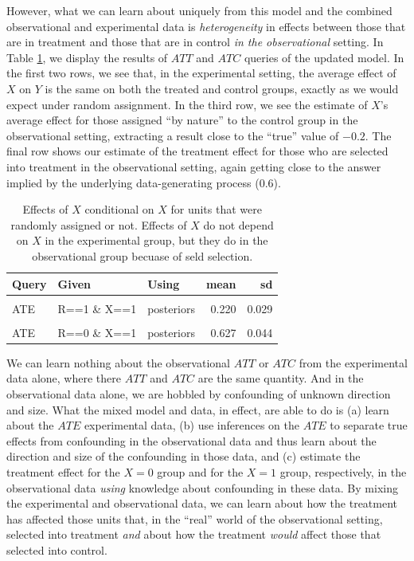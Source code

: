 \documentclass[
  12pt,
]{book}
\begin{document}
However, what we can learn about uniquely from this model and the combined observational and experimental data is \emph{heterogeneity} in effects between those that are in treatment and those that are in control \emph{in the observational} setting. In Table \ref{tab:combexpobsattatc}, we display the results of \(ATT\) and \(ATC\) queries of the updated model. In the first two rows, we see that, in the experimental setting, the average effect of \(X\) on \(Y\) is the same on both the treated and control groups, exactly as we would expect under random assignment. In the third row, we see the estimate of \(X\)'s average effect for those assigned ``by nature'' to the control group in the observational setting, extracting a result close to the ``true'' value of \(-0.2\). The final row shows our estimate of the treatment effect for those who are selected into treatment in the observational setting, again getting close to the answer implied by the underlying data-generating process (\(0.6\)).

\begin{table}

\caption{\label{tab:combexpobsattatc}Effects of $X$ conditional on $X$ for units that were randomly assigned or not.  Effects of $X$ do not depend on $X$ in the experimental group, but they do in the observational group becuase of seld selection. }
\centering
\begin{tabular}[t]{lllrr}
\toprule
Query & Given & Using & mean & sd\\
\midrule
\cellcolor{gray!6}{ATE} & \cellcolor{gray!6}{R==1 \& X==0} & \cellcolor{gray!6}{posteriors} & \cellcolor{gray!6}{0.220} & \cellcolor{gray!6}{0.029}\\
ATE & R==1 \& X==1 & posteriors & 0.220 & 0.029\\
\cellcolor{gray!6}{ATE} & \cellcolor{gray!6}{R==0 \& X==0} & \cellcolor{gray!6}{posteriors} & \cellcolor{gray!6}{-0.159} & \cellcolor{gray!6}{0.025}\\
ATE & R==0 \& X==1 & posteriors & 0.627 & 0.044\\
\bottomrule
\end{tabular}
\end{table}

We can learn nothing about the observational \(ATT\) or \(ATC\) from the experimental data alone, where there \(ATT\) and \(ATC\) are the same quantity. And in the observational data alone, we are hobbled by confounding of unknown direction and size. What the mixed model and data, in effect, are able to do is (a) learn about the \(ATE\) experimental data, (b) use inferences on the \(ATE\) to separate true effects from confounding in the observational data and thus learn about the direction and size of the confounding in those data, and (c) estimate the treatment effect for the \(X=0\) group and for the \(X=1\) group, respectively, in the observational data \emph{using} knowledge about confounding in these data. By mixing the experimental and observational data, we can learn about how the treatment has affected those units that, in the ``real'' world of the observational setting, selected into treatment \emph{and} about how the treatment \emph{would} affect those that selected into control.
\end{document}
